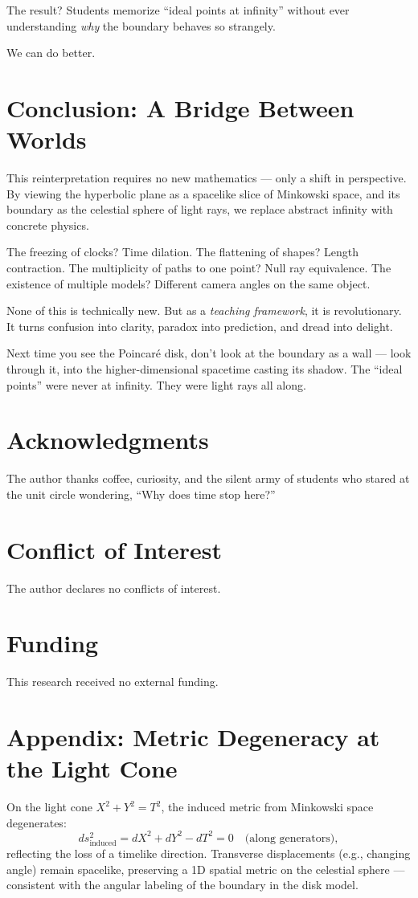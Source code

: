 \documentclass[10pt]{article}
\begin{document}
The result? Students memorize ``ideal points at infinity'' without ever understanding \emph{why} the boundary behaves so strangely.

We can do better.

\section*{Conclusion: A Bridge Between Worlds}

This reinterpretation requires no new mathematics --- only a shift in perspective. By viewing the hyperbolic plane as a spacelike slice of Minkowski space, and its boundary as the celestial sphere of light rays, we replace abstract infinity with concrete physics.

The freezing of clocks? Time dilation.
The flattening of shapes? Length contraction.
The multiplicity of paths to one point? Null ray equivalence.
The existence of multiple models? Different camera angles on the same object.

None of this is technically new. But as a \emph{teaching framework}, it is revolutionary. It turns confusion into clarity, paradox into prediction, and dread into delight.

Next time you see the Poincaré disk, don't look at the boundary as a wall --- look through it, into the higher-dimensional spacetime casting its shadow. The ``ideal points'' were never at infinity. They were light rays all along.

\section*{Acknowledgments}

The author thanks coffee, curiosity, and the silent army of students who stared at the unit circle wondering, ``Why does time stop here?''

\section*{Conflict of Interest}
The author declares no conflicts of interest.

\section*{Funding}
This research received no external funding.

\appendix

\section*{Appendix: Metric Degeneracy at the Light Cone}

On the light cone $X^2 + Y^2 = T^2$, the induced metric from Minkowski space degenerates:
\begin{equation*}
ds_{\text{induced}}^2 = dX^2 + dY^2 - dT^2 = 0 \quad \text{(along generators)},
\end{equation*}
reflecting the loss of a timelike direction. Transverse displacements (e.g., changing angle) remain spacelike, preserving a 1D spatial metric on the celestial sphere --- consistent with the angular labeling of the boundary in the disk model.
\end{document}
